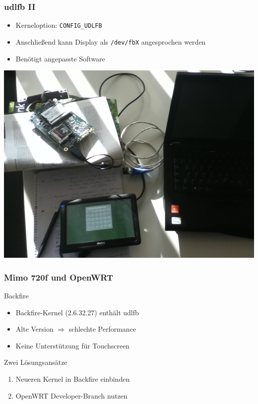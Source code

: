 \documentclass{beamer}
\begin{document}
	\begin{frame}
		\frametitle{udlfb II}
		\begin{itemize}
			\item Kerneloption: \lstinline{CONFIG_UDLFB}
			\item Anschließend kann Display als \lstinline{/dev/fbX} angesprochen werden
			\item Benötigt angepasste Software
		\end{itemize}
		\pause
		\begin{center}
			\includegraphics[scale=0.2]{img/mimo_hacking_1.jpg}
		\end{center}
	\end{frame}
			
	\begin{frame}
		\frametitle{Mimo 720f und OpenWRT}
    \begin{block}{Backfire}
    	\begin{itemize}
	    	\item Backfire-Kernel (2.6.32.27) enthält udlfb
    		\item Alte Version $\Rightarrow$ schlechte Performance
    		\item Keine Unterstützung für Touchscreen
    	\end{itemize}
    \end{block}
    \begin{block}{Zwei Lösungsansätze}
		\begin{enumerate}
			\item Neueren Kernel in Backfire einbinden
			\item OpenWRT Developer-Branch nutzen
		\end{enumerate}
    \end{block}
	\end{frame}
	
\end{document}
